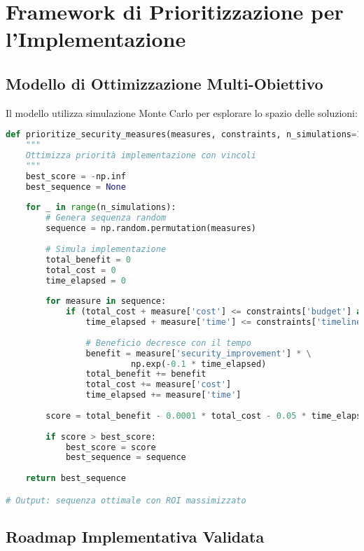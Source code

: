 \section{Framework di Prioritizzazione per l'Implementazione}

\subsection{Modello di Ottimizzazione Multi-Obiettivo}

Il modello utilizza simulazione Monte Carlo per esplorare lo spazio delle soluzioni:

\begin{lstlisting}[language=Python, caption=Prioritizzazione misure di sicurezza]
def prioritize_security_measures(measures, constraints, n_simulations=10000):
    """
    Ottimizza priorità implementazione con vincoli
    """
    best_score = -np.inf
    best_sequence = None
    
    for _ in range(n_simulations):
        # Genera sequenza random
        sequence = np.random.permutation(measures)
        
        # Simula implementazione
        total_benefit = 0
        total_cost = 0
        time_elapsed = 0
        
        for measure in sequence:
            if (total_cost + measure['cost'] <= constraints['budget'] and
                time_elapsed + measure['time'] <= constraints['timeline']):
                
                # Beneficio decresce con il tempo
                benefit = measure['security_improvement'] * \
                         np.exp(-0.1 * time_elapsed)
                total_benefit += benefit
                total_cost += measure['cost']
                time_elapsed += measure['time']
        
        score = total_benefit - 0.0001 * total_cost - 0.05 * time_elapsed
        
        if score > best_score:
            best_score = score
            best_sequence = sequence
    
    return best_sequence

# Output: sequenza ottimale con ROI massimizzato
\end{lstlisting}

\subsection{Roadmap Implementativa Validata}

